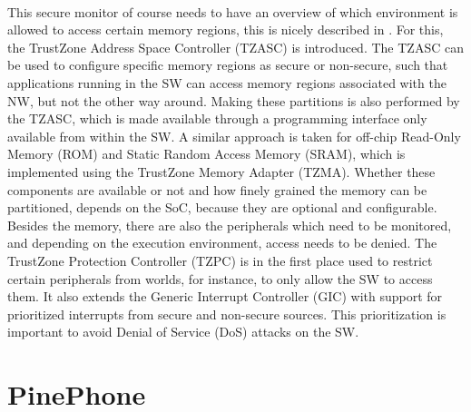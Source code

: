 \paragraph*{}
This secure monitor of course needs to have an overview of which environment is allowed to access certain memory regions, this is nicely described in \cite{PintoSandro2019DATA}. For this, the TrustZone Address Space Controller (TZASC) is introduced. The TZASC can be used to configure specific memory regions as secure or non-secure, such that applications running in the SW can access memory regions associated with the NW, but not the other way around. Making these partitions is also performed by the TZASC, which is made available through a programming interface only available from within the SW. A similar approach is taken for off-chip Read-Only Memory (ROM) and Static Random Access Memory (SRAM), which is implemented using the TrustZone Memory Adapter (TZMA). Whether these components are available or not and how finely grained the memory can be partitioned, depends on the SoC, because they are optional and configurable. Besides the memory, there are also the peripherals which need to be monitored, and depending on the execution environment, access needs to be denied. The TrustZone Protection Controller (TZPC) is in the first place used to restrict certain peripherals from worlds, for instance, to only allow the SW to access them. It also extends the Generic Interrupt Controller (GIC) with support for prioritized interrupts from secure and non-secure sources. This prioritization is important to avoid Denial of Service (DoS) attacks on the SW.

\section{PinePhone}

